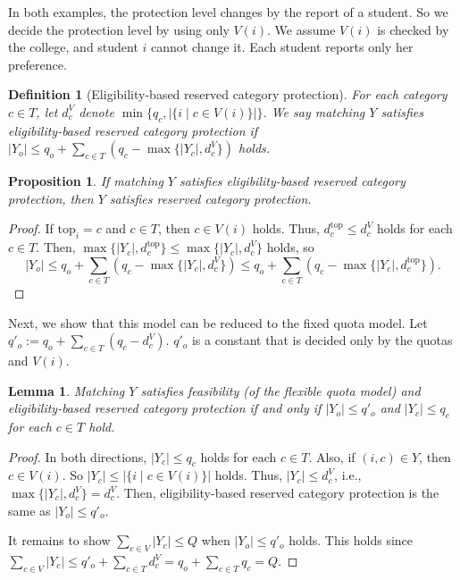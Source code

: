 \documentclass{article}
\newtheorem{definition}{Definition}
\newtheorem{lemma}{Lemma}
\newtheorem{proposition}{Proposition}
\begin{document}
In both examples, the protection level changes by the report of a student.
So we decide the protection level by using only $V(i)$.
We assume $V(i)$ is checked by the college, and student $i$ cannot change it.
Each student reports only her preference.

\begin{definition}[Eligibility-based reserved category protection]
For each category $c\in T$, let $d^V_c$ denote $\min\{q_c, |\{i \mid c\in V(i)\}|\}$.
We say matching $Y$ satisfies eligibility-based reserved category protection
if $|Y_o|\leq q_o+\sum_{c\in T}(q_c-\max\{|Y_c|, d^V_c\})$ holds.
\end{definition}

\begin{proposition}
If matching $Y$ satisfies eligibility-based reserved category protection,
then $Y$ satisfies reserved category protection.
\end{proposition}
\begin{proof}
If $\text{top}_i=c$ and $c\in T$, then $c\in V(i)$ holds.
Thus, $d^{\mathrm{top}}_c\le d^V_c$ holds for each $c\in T$.
Then, $\max\{|Y_c|, d^{\mathrm{top}}_c\}\le\max\{|Y_c|, d^V_c\}$ holds, so
\[
|Y_o|\le q_o+\sum_{c\in T}(q_c-\max\{|Y_c|, d^V_c\})
\le q_o+\sum_{c\in T}(q_c-\max\{|Y_c|, d^{\mathrm{top}}_c\}).
\]
\end{proof}

Next, we show that this model can be reduced to the fixed quota model.
Let $q'_o := q_o+\sum_{c\in T}(q_c-d^V_c)$.
$q'_o$ is a constant that is decided only by the quotas and $V(i)$.

\begin{lemma}\label{lem:reduction}
Matching $Y$ satisfies feasibility (of the flexible quota model) and
eligibility-based reserved category protection if and only if
$|Y_o|\le q'_o$ and $|Y_c|\le q_c$ for each $c\in T$ hold.
\end{lemma}
\begin{proof}
In both directions, $|Y_c|\le q_c$ holds for each $c\in T$.
Also, if $(i,c)\in Y$, then $c\in V(i)$. So $|Y_c|\le |\{i \mid c\in V(i)\}|$ holds.
Thus, $|Y_c|\le d^V_c$, i.e., $\max\{|Y_c|, d^V_c\}=d^V_c$.
Then, eligibility-based reserved category protection is the same as $|Y_o|\le q'_o$.

It remains to show $\sum_{c\in V}|Y_c|\le Q$ when $|Y_o|\le q'_o$ holds.
This holds since
$\sum_{c\in V}|Y_c|\le q'_o+\sum_{c\in T}d^V_c=q_o+\sum_{c\in T}q_c=Q$.
\end{proof}
\end{document}
